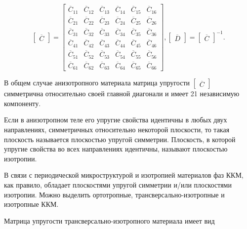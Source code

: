 \documentclass[12pt, a4paper]{article}
\begin{document}
\[
\begin{bmatrix}
		\overline{C}
\end{bmatrix}=
\begin{bmatrix}
	\overline{C}_{11}& \overline{C}_{12}& \overline{C}_{13}& \overline{C}_{14}& \overline{C}_{15}& \overline{C}_{16}\\
	\overline{C}_{21}& \overline{C}_{22}& \overline{C}_{23}& \overline{C}_{24}& \overline{C}_{25}& \overline{C}_{26}\\
	\overline{C}_{31}& \overline{C}_{32}& \overline{C}_{33}& \overline{C}_{34}& \overline{C}_{35}& \overline{C}_{36}\\
	\overline{C}_{41}& \overline{C}_{42}& \overline{C}_{43}& \overline{C}_{44}& \overline{C}_{45}& \overline{C}_{46}\\
	\overline{C}_{51}& \overline{C}_{52}& \overline{C}_{53}& \overline{C}_{54}& \overline{C}_{55}& \overline{C}_{56}\\
	\overline{C}_{61}& \overline{C}_{62}& \overline{C}_{63}& \overline{C}_{64}& \overline{C}_{65}& \overline{C}_{66}
\end{bmatrix},
\begin{bmatrix}
	\overline{D}
\end{bmatrix}=\begin{bmatrix}
\overline{C}
\end{bmatrix}^{-1}.
\]

В общем случае анизотропного материала матрица упругости $\begin{bmatrix} \overline{C}
\end{bmatrix}$ симметрична относительно своей главной диагонали и имеет 21 независимую компоненту.

Если в анизотропном теле его упругие свойства идентичны в любых двух направлениях, симметричных относительно некоторой плоскости, то такая плоскость называется плоскостью упругой симметрии. Плоскость, в которой упругие свойства во всех направлениях идентичны, называют плоскостью изотропии.

В связи с периодической микроструктурой и изотропией материалов фаз ККМ, как правило, обладает плоскостями упругой симметрии и/или плоскостями изотропии. Можно выделить ортотропные, трансверсально-изотропные и изотропные ККМ. 

Матрица упругости трансверсально-изотропного материала имеет вид
\end{document}
